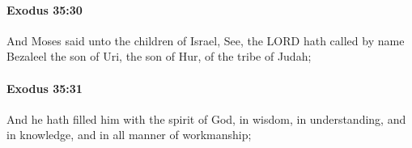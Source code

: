 		\paragraph{Exodus 35:30} %
			\label{EXODUS-35-30}

			And Moses said unto the children of Israel, See, the LORD hath called by name Bezaleel the son of Uri, the son of Hur, of the tribe of Judah;


		\paragraph{Exodus 35:31} %
			\label{EXODUS-35-31}

			And he hath filled him with the spirit of God, in wisdom, in understanding, and in knowledge, and in all manner of workmanship;


